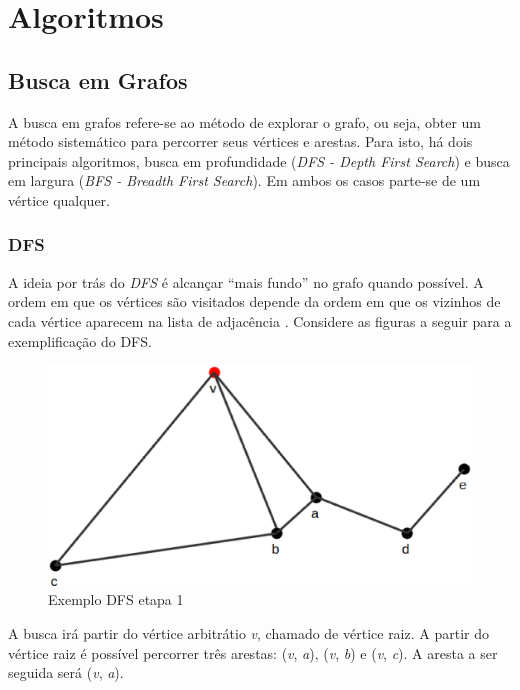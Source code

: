 \section{Algoritmos}

\subsection{Busca em Grafos}

A busca em grafos refere-se ao método de explorar o grafo, ou seja, obter um método sistemático para percorrer seus vértices e arestas. Para isto, há dois principais algoritmos, busca em profundidade (\textit{DFS - Depth First Search}) e busca em largura (\textit{BFS - Breadth First Search}). Em ambos os casos parte-se de um vértice qualquer.

\subsubsection{DFS}
A ideia por trás do \textit{DFS} é alcançar ``mais fundo'' no grafo quando possível. A ordem em que os vértices são visitados depende da ordem em que os vizinhos de cada vértice aparecem na lista de adjacência \cite{Cormen:2001}. Considere as figuras a seguir para a exemplificação do DFS.

\begin{figure}[!h]
	\centering
	\includegraphics[scale=0.4]{figuras/capitulo1/dfs/dfs1.eps}
	\caption{Exemplo DFS etapa 1}
	\label{dfs1}
\end{figure}

A busca irá partir do vértice arbitrátio \textit{v}, chamado de vértice raiz. A partir do vértice raiz é possível percorrer três arestas: (\textit{v}, \textit{a}), (\textit{v}, \textit{b}) e (\textit{v}, \textit{c}). A aresta a ser seguida será (\textit{v}, \textit{a}).

